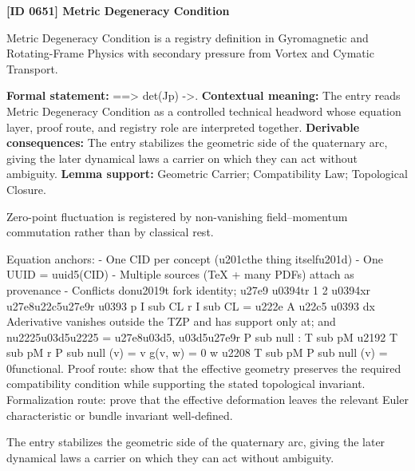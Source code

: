 \clearpage
\noindent\textbf{[ID 0651] Metric Degeneracy Condition}\par
\vspace{0.35em}
\begingroup\small
{}
Metric Degeneracy Condition is a registry definition in Gyromagnetic and Rotating-Frame Physics with secondary pressure from Vortex and Cymatic Transport.

\begingroup\footnotesize\setlength{\emergencystretch}{3em}\sloppy
\textbf{Formal statement:} ==> det(Jp) ->. \textbf{Contextual meaning:} The entry reads Metric Degeneracy Condition as a controlled technical headword whose equation layer, proof route, and registry role are interpreted together. \textbf{Derivable consequences:} The entry stabilizes the geometric side of the quaternary arc, giving the later dynamical laws a carrier on which they can act without ambiguity. \textbf{Lemma support:} Geometric Carrier; Compatibility Law; Topological Closure.\par
\endgroup

Zero-point fluctuation is registered by non-vanishing field--momentum commutation rather than by classical rest.

Equation anchors: - One CID per concept (u201cthe thing itselfu201d) - One UUID = uuid5(CID) - Multiple sources (TeX + many PDFs) attach as provenance - Conflicts donu2019t fork identity; u27e9 u0394tr 1 2 u0394xr u27e8u22c5u27e9r u0393 p I sub CL r I sub CL = u222e A u22c5 u0393 dx Aderivative vanishes outside the TZP and has support only at; and nu2225u03d5u2225 = u27e8u03d5, u03d5u27e9r P sub null : T sub pM u2192 T sub pM r P sub null (v) = v g(v, w) = 0 w u2208 T sub pM P sub null (v) = 0functional. Proof route: show that the effective geometry preserves the required compatibility condition while supporting the stated topological invariant. Formalization route: prove that the effective deformation leaves the relevant Euler characteristic or bundle invariant well-defined.

The entry stabilizes the geometric side of the quaternary arc, giving the later dynamical laws a carrier on which they can act without ambiguity.
\endgroup

